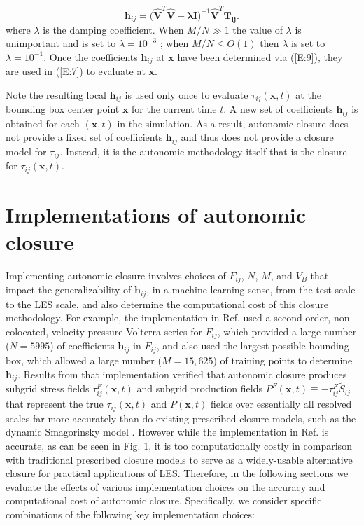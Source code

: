 %
\begin{equation}
	\label{E:9}
	\mathbf{h}_{ij} 
	= \bigg( \mathbf{\widehat{V}}^T \mathbf{\widehat{V}} + \mathbf{\lambda I} \bigg)^{-1} 
	\mathbf{\widehat{V}}^T \mathbf{T_{ij}}.
\end{equation}
%
%      
where  $\lambda$ is the damping coefficient. When $M/N \gg 1$  the value of  $\lambda$ is unimportant and is set to $\lambda = 10^{-3}$ ; when $M/N \leq O(1)$  then $\lambda$   is set to $\lambda = 10^{-1}$. Once the coefficients $\mathbf{h}_{ij}$  at $\mathbf{x}$ have been determined via (\ref{E:9}), they are used in (\ref{E:7}) to evaluate   at $\mathbf{x}$. 

Note the resulting local $\mathbf{h}_{ij}$   is used only once to evaluate $\tau_{ij}(\mathbf{x},t)$   at the bounding box center point $\mathbf{x}$ for the current time $t$. A new set of coefficients  $\mathbf{h}_{ij}$ is obtained for each $(\mathbf{x},t)$  in the simulation. As a result, autonomic closure does not provide a fixed set of coefficients $\mathbf{h}_{ij}$  and thus does not provide a closure model for $\tau_{ij}$. Instead, it is the autonomic methodology itself that is the closure for $\tau_{ij}(\mathbf{x},t)$.

\section{Implementations of autonomic closure }

Implementing autonomic closure involves choices of $F_{ij}$, $N$, $M$, and $V_B$ that impact the generalizability of $\mathbf{h}_{ij}$, in a machine learning sense, from the test scale to the LES scale, and also determine the computational cost of this closure methodology. For example, the implementation in Ref. \cite{king2016autonomic} used a second-order, non-colocated, velocity-pressure Volterra series for $F_{ij}$, which provided a large number ($N = 5995$) of coefficients $\mathbf{h}_{ij}$  in $F_{ij}$, and also used the largest possible bounding box, which allowed a large number ($M  = 15,625$) of training points to determine $\mathbf{h}_{ij}$. Results from that implementation verified that autonomic closure produces subgrid stress fields $\tau_{ij}^{F}(\mathbf{x},t)$   and subgrid production fields  $P^{F}(\mathbf{x},t) \equiv -\tau_{ij}^{F}\widetilde{S}_{ij}$ that represent the true $\tau_{ij}(\mathbf{x},t)$  and  $P(\mathbf{x},t)$   fields over essentially all resolved scales far more accurately than do existing prescribed closure models, such as the dynamic Smagorinsky model \cite{king2016autonomic}. 
However while the implementation in Ref. \cite{king2016autonomic} is accurate, as can be seen in Fig. 1, it is too computationally costly in comparison with traditional prescribed closure models to serve as a widely-usable alternative closure for practical applications of LES. Therefore, in the following sections we evaluate the effects of various implementation choices on the accuracy and computational cost of autonomic closure. Specifically, we consider specific combinations of the following key implementation choices: 

